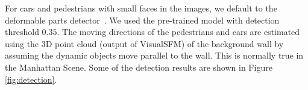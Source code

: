 For cars and pedestrians with small faces in the images, we default to the deformable parts
detector~\cite{lsvm-pami,voc-release5}. %
We used the pre-trained model with detection threshold $0.35$.
The moving directions of the pedestrians and cars are estimated using the 3D point cloud (output of VisualSFM) of the background wall by assuming the dynamic objects move parallel to the wall. This is normally true in the Manhattan Scene. Some of the detection results are shown in Figure \ref{fig:detection}.


